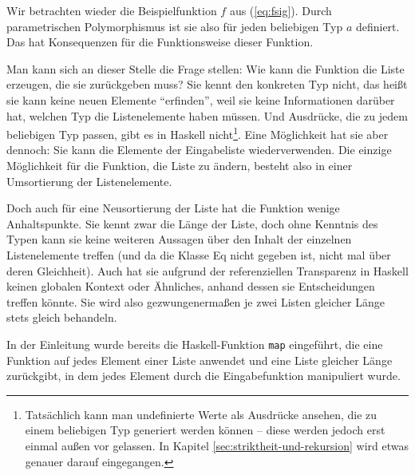 Wir betrachten wieder die Beispielfunktion $f$ aus (\ref{eq:fsig}). Durch parametrischen Polymorphismus ist sie also für jeden beliebigen
Typ $a$ definiert. Das hat Konsequenzen für die Funktionsweise dieser Funktion.

Man kann sich an dieser Stelle die Frage stellen: Wie kann die Funktion die Liste erzeugen, die sie zurückgeben muss? Sie kennt den konkreten Typ nicht,
das heißt sie kann keine neuen Elemente ``erfinden'', weil sie keine Informationen darüber hat, welchen Typ die Listenelemente haben müssen.
Und Ausdrücke, die zu jedem beliebigen Typ passen, gibt es in Haskell
nicht\footnote{Tatsächlich kann man undefinierte Werte als Ausdrücke ansehen, die zu einem beliebigen Typ generiert werden können --
diese werden jedoch erst einmal außen vor gelassen. In Kapitel \ref{sec:striktheit-und-rekursion} wird etwas genauer darauf eingegangen.}.
Eine Möglichkeit hat sie aber dennoch: Sie kann die Elemente der Eingabeliste wiederverwenden.
Die einzige Möglichkeit für die Funktion, die Liste zu ändern, besteht also in einer Umsortierung der Listenelemente.

Doch auch für eine Neusortierung der Liste hat die Funktion wenige Anhaltspunkte. Sie kennt zwar die Länge der Liste, doch ohne Kenntnis des Typen kann sie keine weiteren Aussagen über den Inhalt der einzelnen Listenelemente treffen (und da die Klasse Eq
nicht gegeben ist, nicht mal über deren Gleichheit). Auch hat sie aufgrund der referenziellen Transparenz %
in Haskell keinen globalen Kontext oder Ähnliches, anhand dessen sie Entscheidungen treffen könnte.
Sie wird also gezwungenermaßen je zwei Listen gleicher Länge stets gleich behandeln.

In der Einleitung wurde bereits die Haskell-Funktion \texttt{map} eingeführt, die eine Funktion auf jedes Element einer Liste
anwendet und eine Liste gleicher Länge zurückgibt, in dem jedes Element durch die Eingabefunktion manipuliert wurde.


